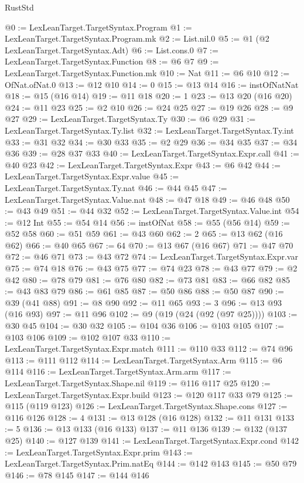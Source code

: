 \begin{lexlean}{RustStd}
\begin{coremodule}
@0 := LexLeanTarget.TargetSyntax.Program
@1 := LexLeanTarget.TargetSyntax.Program.mk
@2 := List.nil.{0}
@5 := @1 (@2 LexLeanTarget.TargetSyntax.Adt)
@6 := List.cons.{0}
@7 := LexLeanTarget.TargetSyntax.Function
@8 := @6 @7
@9 := LexLeanTarget.TargetSyntax.Function.mk
@10 := Nat
@11 := @6 @10
@12 := OfNat.ofNat.{0}
@13 := @12 @10
@14 := 0
@15 := @13 @14
@16 := instOfNatNat
@18 := @15 (@16 @14)
@19 := @11 @18
@20 := 1
@23 := @13 @20 (@16 @20)
@24 := @11 @23
@25 := @2 @10
@26 := @24 @25
@27 := @19 @26
@28 := @9 @27
@29 := LexLeanTarget.TargetSyntax.Ty
@30 := @6 @29
@31 := LexLeanTarget.TargetSyntax.Ty.list
@32 := LexLeanTarget.TargetSyntax.Ty.int
@33 := @31 @32
@34 := @30 @33
@35 := @2 @29
@36 := @34 @35
@37 := @34 @36
@39 := @28 @37 @33
@40 := LexLeanTarget.TargetSyntax.Expr.call
@41 := @40 @23
@42 := LexLeanTarget.TargetSyntax.Expr
@43 := @6 @42
@44 := LexLeanTarget.TargetSyntax.Expr.value
@45 := LexLeanTarget.TargetSyntax.Ty.nat
@46 := @44 @45
@47 := LexLeanTarget.TargetSyntax.Value.nat
@48 := @47 @18
@49 := @46 @48
@50 := @43 @49
@51 := @44 @32
@52 := LexLeanTarget.TargetSyntax.Value.int
@54 := @12 Int
@55 := @54 @14
@56 := instOfNat
@58 := @55 (@56 @14)
@59 := @52 @58
@60 := @51 @59
@61 := @43 @60
@62 := 2
@65 := @13 @62 (@16 @62)
@66 := @40 @65
@67 := 64
@70 := @13 @67 (@16 @67)
@71 := @47 @70
@72 := @46 @71
@73 := @43 @72
@74 := LexLeanTarget.TargetSyntax.Expr.var
@75 := @74 @18
@76 := @43 @75
@77 := @74 @23
@78 := @43 @77
@79 := @2 @42
@80 := @78 @79
@81 := @76 @80
@82 := @73 @81
@83 := @66 @82
@85 := @43 @83 @79
@86 := @61 @85
@87 := @50 @86
@88 := @50 @87
@90 := @39 (@41 @88)
@91 := @8 @90
@92 := @11 @65
@93 := 3
@96 := @13 @93 (@16 @93)
@97 := @11 @96
@102 := @9 (@19 (@24 (@92 (@97 @25))))
@103 := @30 @45
@104 := @30 @32
@105 := @104 @36
@106 := @103 @105
@107 := @103 @106
@109 := @102 @107 @33
@110 := LexLeanTarget.TargetSyntax.Expr.match
@111 := @110 @33
@112 := @74 @96
@113 := @111 @112
@114 := LexLeanTarget.TargetSyntax.Arm
@115 := @6 @114
@116 := LexLeanTarget.TargetSyntax.Arm.arm
@117 := LexLeanTarget.TargetSyntax.Shape.nil
@119 := @116 @117 @25
@120 := LexLeanTarget.TargetSyntax.Expr.build
@123 := @120 @117 @33 @79
@125 := @115 (@119 @123)
@126 := LexLeanTarget.TargetSyntax.Shape.cons
@127 := @116 @126
@128 := 4
@131 := @13 @128 (@16 @128)
@132 := @11 @131
@133 := 5
@136 := @13 @133 (@16 @133)
@137 := @11 @136
@139 := @132 (@137 @25)
@140 := @127 @139
@141 := LexLeanTarget.TargetSyntax.Expr.cond
@142 := LexLeanTarget.TargetSyntax.Expr.prim
@143 := LexLeanTarget.TargetSyntax.Prim.natEq
@144 := @142 @143
@145 := @50 @79
@146 := @78 @145
@147 := @144 @146

\end{coremodule}
\end{lexlean}
